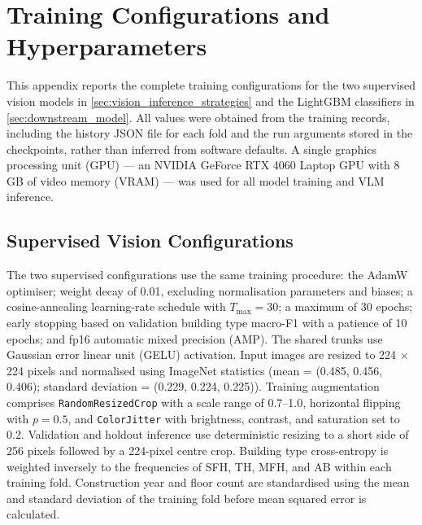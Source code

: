 \chapter{Training Configurations and Hyperparameters}
\label{ch:appendix_b}

This appendix reports the complete training configurations for the two supervised vision models in \cref{sec:vision_inference_strategies} and the LightGBM classifiers in \cref{sec:downstream_model}.
All values were obtained from the training records, including the history JSON file for each fold and the run arguments stored in the checkpoints, rather than inferred from software defaults.
A single graphics processing unit (GPU) --- an NVIDIA GeForce RTX 4060 Laptop GPU with 8\,GB of video memory (VRAM) --- was used for all model training and \ac{VLM} inference.

\section{Supervised Vision Configurations}
\label{sec:appendix_b_vision_configs}

The two supervised configurations use the same training procedure: the AdamW optimiser; weight decay of 0.01, excluding normalisation parameters and biases; a cosine-annealing learning-rate schedule with $T_{\max} = 30$; a maximum of 30 epochs; early stopping based on validation building type macro-F1 with a patience of 10 epochs; and fp16 automatic mixed precision (AMP).
The shared trunks use Gaussian error linear unit (GELU) activation.
Input images are resized to 224 $\times$ 224 pixels and normalised using ImageNet statistics (mean = (0.485, 0.456, 0.406); standard deviation = (0.229, 0.224, 0.225)).
Training augmentation comprises \texttt{RandomResizedCrop} with a scale range of 0.7--1.0, horizontal flipping with $p = 0.5$, and \texttt{ColorJitter} with brightness, contrast, and saturation set to 0.2.
Validation and holdout inference use deterministic resizing to a short side of 256 pixels followed by a 224-pixel centre crop.
Building type cross-entropy is weighted inversely to the frequencies of SFH, TH, MFH, and AB within each training fold.
Construction year and floor count are standardised using the mean and standard deviation of the training fold before mean squared error is calculated.

